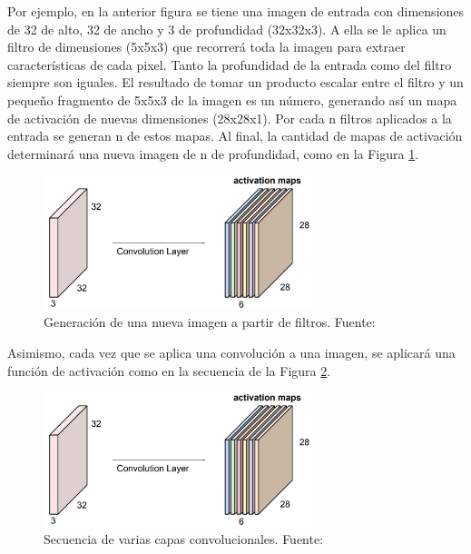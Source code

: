 \begin{itemize}
\begin{itemize}
\begin{itemize}
			Por ejemplo, en la anterior figura se tiene una imagen de entrada con dimensiones de 32 de alto, 32 de ancho y 3 de profundidad (32x32x3). A ella se le aplica un filtro de dimensiones (5x5x3) que recorrerá toda la imagen para extraer características de cada pixel. Tanto la profundidad de la entrada como del filtro siempre son iguales. El resultado de tomar un producto escalar entre el filtro y un pequeño fragmento de 5x5x3 de la imagen es un número, generando así un mapa de activación de nuevas dimensiones (28x28x1). Por cada n filtros aplicados a la entrada se generan n de estos mapas. Al final, la cantidad de mapas de activación determinará una nueva imagen de n de profundidad, como en la Figura \ref{2:fig27}.
			\begin{figure}[h]
				\begin{center}
					\includegraphics[width=0.7\textwidth]{2/figures/filtros_cnn.jpg}
					\caption{Generación de una nueva imagen a partir de filtros. Fuente: \cite{tec_li2019cnn}}
					\label{2:fig27}
				\end{center}
			\end{figure}
			
			Asimismo, cada vez que se aplica una convolución a una imagen, se aplicará una función de activación como en la secuencia de la Figura \ref{2:fig28}.
			\begin{figure}[h]
				\begin{center}
					\includegraphics[width=0.7\textwidth]{2/figures/filtros_cnn.jpg}
					\caption{Secuencia de varias capas convolucionales. Fuente: \cite{tec_li2019cnn}}
					\label{2:fig28}
				\end{center}
			\end{figure}
			

\end{itemize}
\end{itemize}
\end{itemize}
